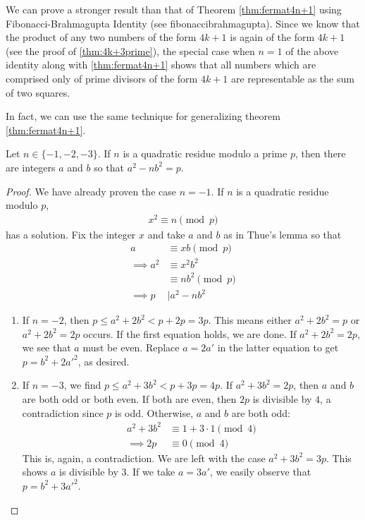 \documentclass{subfile}
\begin{document}
	\begin{remark}
		We can prove a stronger result than that of Theorem \autoref{thm:fermat4n+1} using Fibonacci-Brahmagupta Identity (see \gls{fibonaccibrahmagupta}). Since we know that the product of any two numbers of the form $4k+1$ is again of the form $4k+1$ (see the proof of \autoref{thm:4k+3prime}), the special case when $n=1$ of the above identity along with \autoref{thm:fermat4n+1} shows that all numbers which are comprised only of prime divisors of the form $4k+1$ are representable as the sum of two squares.
	\end{remark}
	In fact, we can use the same technique for generalizing theorem \autoref{thm:fermat4n+1}.
	\begin{theorem}\label{thm:gen4n+1}
		Let $n\in\{-1,-2,-3\}$. If $n$ is a quadratic residue modulo a prime $p$, then there are integers $a$ and $b$ so that $a^2-nb^2=p$.
	\end{theorem}

	\begin{proof}
		We have already proven the case $n=-1$. If $n$ is a quadratic residue modulo $p$,
		\begin{align*}
			x^2\equiv n\pmod p
		\end{align*}
		has a solution. Fix the integer $x$ and take $a$ and $b$ as in Thue's lemma so that
		\begin{align*}
			a
				& \equiv xb\pmod p\\
			\implies a^2
				& \equiv x^2b^2\\
				& \equiv nb^2\pmod p\\
			\implies p
				& \mid a^2-nb^2
		\end{align*}

		\begin{enumerate}
			\item If $n=-2$, then $p\leq a^2+2b^2<p+2p=3p$. This means either $a^2+2b^2=p$ or $a^2+2b^2=2p$ occurs. If the first equation holds, we are done. If $a^2+2b^2=2p$, we see that $a$ must be even. Replace $a=2a'$ in the latter equation to get $p=b^2+2a'^2$, as desired.
			\item If $n=-3$, we find $p\leq a^2+3b^2<p+3p=4p$. If $a^2+3b^2=2p$, then $a$ and $b$ are both odd or both even. If both are even, then $2p$ is divisible by $4$, a contradiction since $p$ is odd. Otherwise, $a$ and $b$ are both odd:
			\begin{align*}
				a^2+3b^2 & \equiv1+3\cdot 1\pmod 4\\
				\implies 2p	 & \equiv 0 \pmod 4
			\end{align*}
			This is, again, a contradiction. We are left with the case $a^2+3b^2=3p$. This shows $a$ is divisible by $3$. If we take $a=3a'$, we easily observe that $p=b^2+3a'^2$.
		\end{enumerate}
	\end{proof}
\end{document}
